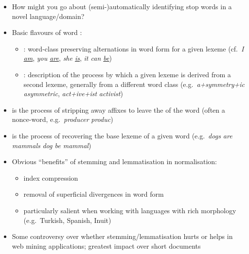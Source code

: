 \documentclass[a4paper,landscape,headrule,footrule,xetex]{foils}
\begin{document}
\begin{itemize}
\item How might you go about (semi-)automatically identifying stop words
  in a novel language/domain?
\end{itemize}








\begin{itemize}
\item Basic flavours of word :
  \begin{itemize}
  \item {}: word-class preserving alternations
    in word form for a given lexeme (cf.\ \textit{I \underline{am}},
    \textit{you \underline{are}}, \textit{she \underline{is}},
    \textit{it can \underline{be}})
  \item {}: description of the process by
    which a given lexeme is derived from a second lexeme, generally from
    a different word class (e.g.\
    \textit{a+symmetry+ic} \infers \textit{asymmetric},
    \textit{act+ive+ist} \infers \textit{activist})
  \end{itemize}
\item {} is the process of stripping away affixes to leave
  the \txx{stem} of the word (often a nonce-word, e.g.\ \textit{producer}
  \infers \textit{produc})

\newpage

\item {} is the process of recovering the base lexeme of a
  given word (e.g.\ \textit{dogs are mammals} \infers \textit{dog be mammal})
\item Obvious ``benefits'' of stemming and lemmatisation in normalisation:
  \begin{itemize}
  \item index compression
  \item removal of superficial divergences in word form
  \item particularly salient when working with languages with rich
    morphology (e.g.\ Turkish, Spanish, Inuit)
  \end{itemize}
\item Some controversy over whether stemming/lemmatisation hurts or
  helps in web mining applications; greatest impact over short documents
\end{itemize}
\end{document}
